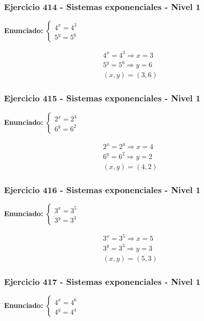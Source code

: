 \documentclass[12pt,a4paper]{article}
\begin{document}
\subsubsection*{Ejercicio 414 - Sistemas exponenciales - Nivel 1}
\textbf{Enunciado:} \(\begin{cases} 4^x=4^{3}\\ 5^y=5^{6}\end{cases}\)

\[
\begin{aligned}
4^x=4^{3}\Rightarrow x=3\\
5^y=5^{6}\Rightarrow y=6\\
\boxed{(x,y)=(3,6)}
\end{aligned}
\]


\subsubsection*{Ejercicio 415 - Sistemas exponenciales - Nivel 1}
\textbf{Enunciado:} \(\begin{cases} 2^x=2^{4}\\ 6^y=6^{2}\end{cases}\)

\[
\begin{aligned}
2^x=2^{4}\Rightarrow x=4\\
6^y=6^{2}\Rightarrow y=2\\
\boxed{(x,y)=(4,2)}
\end{aligned}
\]


\subsubsection*{Ejercicio 416 - Sistemas exponenciales - Nivel 1}
\textbf{Enunciado:} \(\begin{cases} 3^x=3^{5}\\ 3^y=3^{3}\end{cases}\)

\[
\begin{aligned}
3^x=3^{5}\Rightarrow x=5\\
3^y=3^{3}\Rightarrow y=3\\
\boxed{(x,y)=(5,3)}
\end{aligned}
\]


\subsubsection*{Ejercicio 417 - Sistemas exponenciales - Nivel 1}
\textbf{Enunciado:} \(\begin{cases} 4^x=4^{6}\\ 4^y=4^{4}\end{cases}\)
\end{document}

